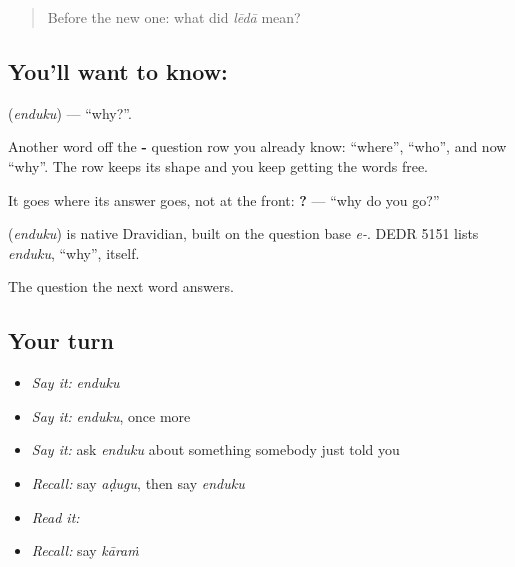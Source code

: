\label{lesson:TE-C74-why}



\begin{quote}
Before the new one: what did \emph{lēdā} mean?
\end{quote}

\subsection*{You'll want to know: }
\textbf{} (\emph{enduku}) — \textquotedblleft{}why?\textquotedblright{}.

Another word off the \textbf{-} question row you already know:  \textquotedblleft{}where\textquotedblright{},  \textquotedblleft{}who\textquotedblright{}, and now  \textquotedblleft{}why\textquotedblright{}. The row keeps its shape and you keep getting the words free.

It goes where its answer goes, not at the front: \textbf{  ?} — \textquotedblleft{}why do you go?\textquotedblright{}

\begin{cousinweb}
\textbf{} (\emph{enduku}) is native Dravidian, built on the question base \emph{e-}. DEDR 5151 lists \emph{enduku}, \textquotedblleft{}why\textquotedblright{}, itself.
\end{cousinweb}

\begin{grammarlens}[title={What you've built}]
The question the next word answers.
\end{grammarlens}

\subsection*{Your turn}
\begin{itemize}
\raggedright
  \item \emph{Say it:} \emph{enduku}
  \item \emph{Say it:} \emph{enduku}, once more
  \item \emph{Say it:} ask \emph{enduku} about something somebody just told you
  \item \emph{Recall:} say \emph{aḍugu}, then say \emph{enduku}
  \item \emph{Read it:} \textbf{}
  \item \emph{Recall:} say \emph{kāraṁ}
\end{itemize}

